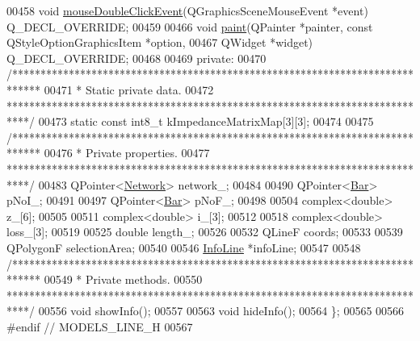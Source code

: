 \begin{DoxyCode}
00458   \textcolor{keywordtype}{void} \hyperlink{group___models_ga9a1fee5b1606ab0deedd04bdab99be70}{mouseDoubleClickEvent}(QGraphicsSceneMouseEvent *event) Q\_DECL\_OVERRIDE;
00459 
00466   \textcolor{keywordtype}{void} \hyperlink{group___models_ga0aa64aed379d434be5942edf572b444b}{paint}(QPainter *painter, const QStyleOptionGraphicsItem *option,
00467              QWidget *widget) Q\_DECL\_OVERRIDE;
00468 
00469 private:
00470   \textcolor{comment}{/*****************************************************************************}
00471 \textcolor{comment}{   * Static private data.}
00472 \textcolor{comment}{   ****************************************************************************/}
00473   static const int8\_t kImpedanceMatrixMap[3][3];
00474 
00475   \textcolor{comment}{/*****************************************************************************}
00476 \textcolor{comment}{   * Private properties.}
00477 \textcolor{comment}{   ****************************************************************************/}
00483   QPointer<\hyperlink{class_network}{Network}> network\_;
00484 
00490   QPointer<\hyperlink{class_bar}{Bar}> pNoI\_;
00491 
00497   QPointer<\hyperlink{class_bar}{Bar}> pNoF\_;
00498 
00504   complex<\textcolor{keywordtype}{double}> z\_[6];
00505 
00511   complex<\textcolor{keywordtype}{double}> i\_[3];
00512 
00518   complex<\textcolor{keywordtype}{double}> loss\_[3];
00519 
00525   \textcolor{keywordtype}{double} length\_;
00526 
00532   QLineF coords;
00533 
00539   QPolygonF selectionArea;
00540 
00546   \hyperlink{class_info_line}{InfoLine} *infoLine;
00547 
00548   \textcolor{comment}{/*****************************************************************************}
00549 \textcolor{comment}{   * Private methods.}
00550 \textcolor{comment}{   ****************************************************************************/}
00556   \textcolor{keywordtype}{void} showInfo();
00557 
00563   \textcolor{keywordtype}{void} hideInfo();
00564 \};
00565 
00566 \textcolor{preprocessor}{#endif  // MODELS\_LINE\_H}
00567 
\end{DoxyCode}
